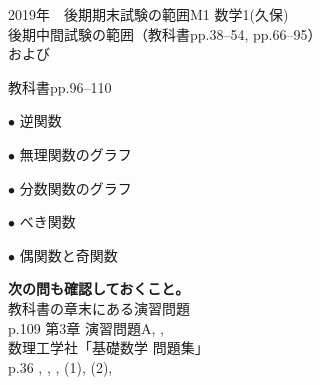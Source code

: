\documentclass[a4paper,landscape,10pt,onecolumn,oneside,notitlepage,final]{jsarticle} %
\newcommand{\printtitle}{2019年　後期期末試験の範囲\quad M1 数学1(久保)}
\begin{document}

\begin{multicols}{2}

\vspace*{15mm}
\Large
\printtitle\\

\large
後期中間試験の範囲（教科書pp.38--54, pp.66--95）\\
および\par

教科書pp.96--110

$\bullet$ 逆関数\par
$\bullet$ 無理関数のグラフ\par
$\bullet$ 分数関数のグラフ\par
$\bullet$ べき関数\par
$\bullet$ 偶関数と奇関数\par

\vspace{10mm}
{\bf 次の問も確認しておくこと。}\\

教科書の章末にある演習問題\\
p.109 第3章 演習問題A, , \\

数理工学社「基礎数学 問題集」\\
p.36 , , , (1), (2), 

\normalsize
\columnbreak %

\renewcommand{\ctoi}{Ckeep} %
\renewcommand{\ckai}{Comit} %
\small\printdoc

\newpage

\renewcommand{\ckai}{Cmagenta} %
\renewcommand{\ctoi}{Comit} %
\printdoc

\newpage

\end{multicols}
\end{document}
